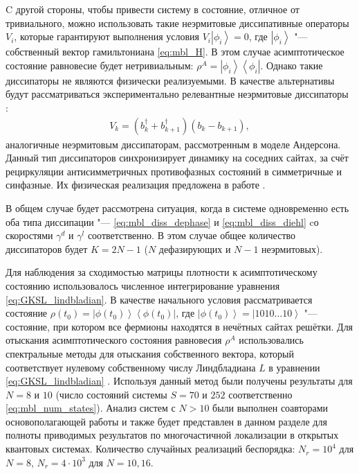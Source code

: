 C другой стороны, чтобы привести систему в состояние, отличное от тривиального, можно использовать такие неэрмитовые диссипативные операторы \(V_i\), которые гарантируют выполнения условия \(V_i \left| \phi_i \right\rangle = 0\), где \(\left| \phi_i \right\rangle\) "--- собственный вектор гамильтониана \cref{eq:mbl_H}. В этом случае асимптотическое состояние равновесие будет нетривиальным: \(\rho^A = \left| \phi_i \right\rangle \left\langle \phi_i \right| \). Однако такие диссипаторы не являются физически реализуемыми. В качестве альтернативы будут рассматриваться экспериментально релевантные неэрмитовые диссипаторы \cite{Diehl2008}:
\begin{equation}
	\label{eq:mbl_diss_diehl}
	\begin{gathered}
		V_k = ( b^\dagger_k + b^\dagger_{k+1}) \left( b_k - b_{k+1} \right),
	\end{gathered}
\end{equation}
аналогичные неэрмитовым диссипаторам, рассмотренным в моделе Андерсона. 
Данный тип диссипаторов синхронизирует динамику на соседних сайтах, за счёт рециркуляции антисимметричных противофазных состояний в симметричные и синфазные.
Их физическая реализация предложена в работе \cite{Marcos2012}.

В общем случае будет рассмотрена ситуация, когда в системе одновременно есть оба типа диссипации "--- \cref{eq:mbl_diss_dephase} и \cref{eq:mbl_diss_diehl} cо скоростями \(\gamma^d\) и \(\gamma^l\) соответственно. В этом случае общее количество диссипаторов будет \(K = 2 N - 1\) (\(N\) дефазирующих и \(N-1\) неэрмитовых). 

Для наблюдения за сходимостью матрицы плотности к асимптотическому состоянию использовалось численное интегрирование уравнения \cref{eq:GKSL_lindbladian}.
В качестве начального условия рассматривается состояние \(\rho(t_0) =\left| \phi(t_0) \right\rangle \left\langle \phi(t_0) \right| \), где \(\left| \phi(t_0) \right\rangle = \left| 1010\ldots10 \right\rangle\) "--- состояние, при котором все фермионы находятся в нечётных сайтах решётки.
Для отыскания асимптотического состояния равновесия \(\rho^A\) использовались спектральные методы для отыскания собственного вектора, который соответствует нулевому собственному числу Линдбладиана \(L\) в уравнении \cref{eq:GKSL_lindbladian} \cite{Nation2015, eigenweb, Hernandez2005}. 
Используя данный метод были получены результаты для \(N=8\) и \(10\) (число состояний системы \(S=70\) и  \(252\) соответственно \cref{eq:mbl_num_states}).
Анализ систем с \(N>10\) были выполнен соавторами основополагающей работы \cite{Vakulchyk2018} и также будет представлен в данном разделе для полноты приводимых результатов по многочастичной локализации в открытых квантовых системах.
Количество случайных реализаций беспорядка: \(N_r=10^4\) для \(N=8\), \(N_r=4 \cdot 10^3 \) для \(N=10, 16\).

